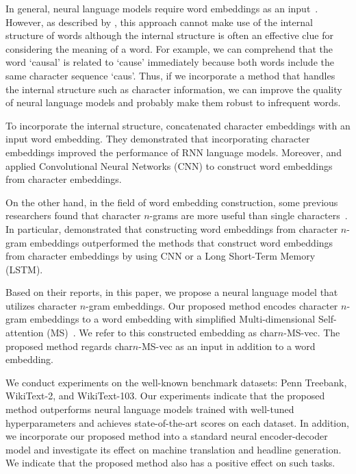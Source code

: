 \documentclass[letterpaper]{article} %
\begin{document}
In general, neural language models require word embeddings as an input~\cite{DBLP:journals/corr/ZarembaSV14}.
However, as described by \cite{verwimp-EtAl:2017:EACLlong}, this approach cannot make use of the internal structure
of words although the internal structure is often an effective clue for considering the meaning of a word.
For example, we can comprehend that the word `causal' is related to `cause' immediately because both words include the same character sequence `caus'.
Thus, if we incorporate a method that handles the internal structure such as character information, we can improve the quality of neural language models and probably make them robust to infrequent words.


To incorporate the internal structure, \cite{verwimp-EtAl:2017:EACLlong} concatenated character embeddings with an input word embedding.
They demonstrated that incorporating character embeddings improved the performance of RNN language models.
Moreover, \cite{Kim:2016:CNL:3016100.3016285} and \cite{45446} applied Convolutional Neural Networks (CNN) to construct word embeddings from character embeddings.


On the other hand, in the field of word embedding construction, some previous researchers found that character $n$-grams are more useful than single characters~\cite{wieting-EtAl:2016:EMNLP2016,TACL999}.
In particular, \cite{wieting-EtAl:2016:EMNLP2016} demonstrated that constructing word embeddings from character $n$-gram embeddings outperformed the methods that construct word embeddings from character embeddings by using CNN or a Long Short-Term Memory (LSTM).


Based on their reports, in this paper, we propose a neural language model that utilizes character $n$-gram embeddings.
Our proposed method encodes character $n$-gram embeddings to a word embedding with simplified Multi-dimensional Self-attention (MS)~\cite{shen2018disan}.
We refer to this constructed embedding as char$n$-MS-vec.
The proposed method regards char$n$-MS-vec as an input in addition to a word embedding.


We conduct experiments on the well-known benchmark datasets: Penn Treebank, WikiText-2, and WikiText-103.
Our experiments indicate that the proposed method outperforms neural language models trained with well-tuned hyperparameters and achieves state-of-the-art scores on each dataset.
In addition, we incorporate our proposed method into a standard neural encoder-decoder model and investigate its effect on machine translation and headline generation.
We indicate that the proposed method also has a positive effect on such tasks.
\end{document}
